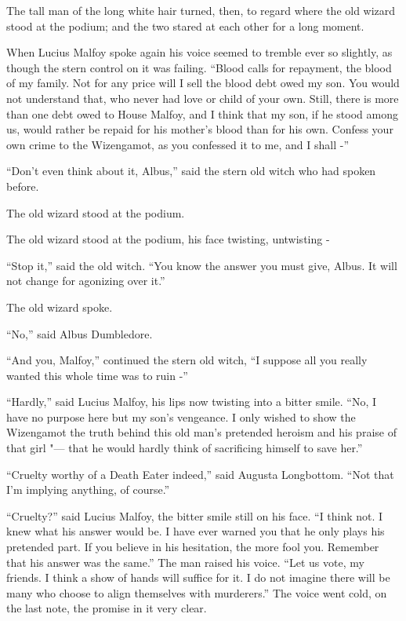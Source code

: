 The tall man of the long white hair turned, then, to regard where the
old wizard stood at the podium; and the two stared at each other for a
long moment.

When Lucius Malfoy spoke again his voice seemed to tremble ever so
slightly, as though the stern control on it was failing. ``Blood calls
for repayment, the blood of my family. Not for any price will I sell the
blood debt owed my son. You would not understand that, who never had
love or child of your own. Still, there is more than one debt owed to
House Malfoy, and I think that my son, if he stood among us, would
rather be repaid for his mother's blood than for his own. Confess your
own crime to the Wizengamot, as you confessed it to me, and I shall -''

``Don't even think about it, Albus,'' said the stern old witch who had
spoken before.

The old wizard stood at the podium.

The old wizard stood at the podium, his face twisting, untwisting -

``Stop it,'' said the old witch. ``You know the answer you must give,
Albus. It will not change for agonizing over it.''

The old wizard spoke.

``No,'' said Albus Dumbledore.

``And you, Malfoy,'' continued the stern old witch, ``I suppose all you
really wanted this whole time was to ruin -''

``Hardly,'' said Lucius Malfoy, his lips now twisting into a bitter
smile. ``No, I have no purpose here but my son's vengeance. I only
wished to show the Wizengamot the truth behind this old man's pretended
heroism and his praise of that girl "--- that he would hardly think of
sacrificing himself to save her.''

``Cruelty worthy of a Death Eater indeed,'' said Augusta Longbottom.
``Not that I'm implying anything, of course.''

``Cruelty?'' said Lucius Malfoy, the bitter smile still on his face. ``I
think not. I knew what his answer would be. I have ever warned you that
he only plays his pretended part. If you believe in his hesitation, the
more fool you. Remember that his answer was the same.'' The man raised
his voice. ``Let us vote, my friends. I think a show of hands will
suffice for it. I do not imagine there will be many who choose to align
themselves with murderers.'' The voice went cold, on the last note, the
promise in it very clear.

